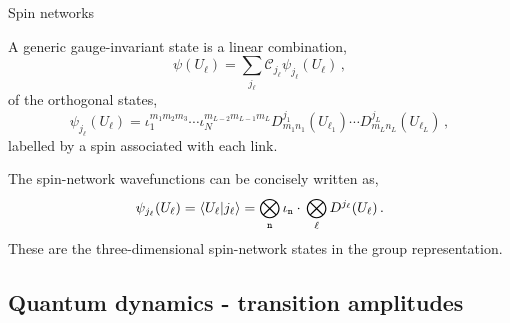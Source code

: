 \documentclass[12pt,titlepage]{article}
\begin{document}
\begin{frame}{Spin networks}
    \begin{list}{\,}{\leftmargin=1em \itemindent=0em}
        \item<1-> A generic gauge-invariant state is a linear combination,
        \begin{equation}
            \psi(U_\ell)=\sum_{j_\ell}\mathcal{C}_{j_\ell}\psi_{j_\ell}(U_\ell)\,,
        \end{equation}
        of the orthogonal states,
        \begin{equation}
            \psi_{j_\ell}(U_\ell)=\iota^{m_1m_2m_3}_1\cdots\iota^{m_{L-2}m_{L-1}m_L}_N D^{j_1}_{m_1n_1}(U_{\ell_1})\cdots D^{j_L}_{m_Ln_L}(U_{\ell_L})\,,
        \end{equation}
        labelled by a spin associated with each link.
        \item<2-> The spin-network wavefunctions can be concisely written as,
        \begin{equation}
            \psi_{j_\ell}(U_\ell)=\braket{U_\ell}{j_\ell}=\bigotimes_\mathtt{n}\iota_\mathtt{n}\cdot\,\bigotimes_\ell D^{j_\ell}(U_\ell)\,.
        \end{equation}
        These are the three-dimensional spin-network states in the group representation.
    \end{list}
\end{frame}

\subsection{Quantum dynamics - transition amplitudes}
\end{document}
